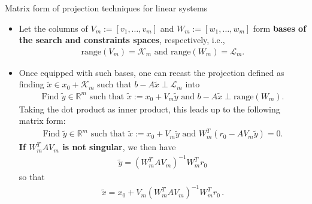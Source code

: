 \documentclass[t,usepdftitle=false]{beamer}
\begin{document}
\begin{frame}{Matrix form of projection techniques for linear systems}
\begin{itemize}
\item Let the columns of $V_m:=[v_1,\dots,v_m]$ and $W_m:=[w_1,\dots,w_m]$ form \textbf{bases of the search and constraints spaces}, respectively, i.e.,
\begin{align*}
\text{range}(V_m)=\mathcal{K}_m\text{ and }\text{range}(W_m)=\mathcal{L}_m.
\end{align*}
\item[]Once equipped with such bases, one can recast the projection defined as finding $\tilde{x}\in x_0+\mathcal{K}_m$ such that $b-A\tilde{x}\perp\mathcal{L}_m$ into
\begin{align*}
\text{Find }\tilde{y}\in\mathbb{R}^m\text{ such that }\tilde{x}:=x_0+V_m\tilde{y}\text{ and }b-A\tilde{x}\perp\text{range}(W_m).
\end{align*}
Taking the dot product as inner product, this leads up to the following matrix form:
\begin{align*}
\text{Find }\tilde{y}\in\mathbb{R}^m\text{ such that }\tilde{x}:=x_0+V_m\tilde{y}\text{ and }W_m^T(r_0-AV_m\tilde{y})=0.
\end{align*}
\textbf{If $W_m^TAV_m$ is not singular}, we then have
\begin{align*}
\tilde{y}=(W_m^TAV_m)^{-1}W_m^Tr_0
\end{align*}
so that\vspace{-.3cm}
\begin{align*}
\boxed{
\tilde{x}=x_0+V_m(W_m^TAV_m)^{-1}W_m^Tr_0
}\,.
\end{align*}
\end{itemize}
\end{frame}
\end{document}

